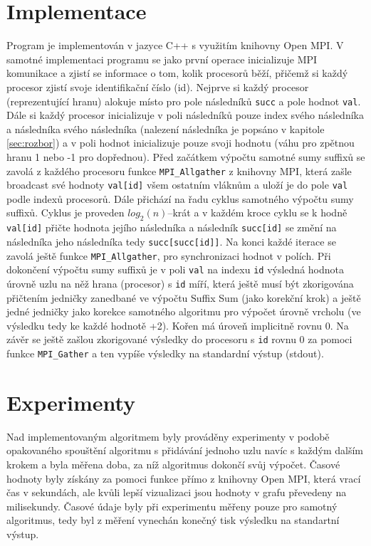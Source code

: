 \documentclass[12pt, a4paper]{article}
\begin{document}
\section{Implementace}
Program je implementován v jazyce C++ s využitím knihovny Open MPI. V samotné implementaci programu se jako první operace inicializuje MPI komunikace a zjistí se informace o tom, kolik procesorů běží, přičemž si každý procesor zjistí svoje identifikační číslo (id). Nejprve si každý procesor (reprezentující hranu) alokuje místo pro pole následníků \texttt{succ} a pole hodnot \texttt{val}. Dále si každý procesor inicializuje v poli následníků pouze index svého následníka a následníka svého následníka (nalezení následníka je popsáno v kapitole\,\ref{sec:rozbor}) a v poli hodnot inicializuje pouze svoji hodnotu (váhu pro zpětnou hranu 1 nebo -1 pro dopřednou). Před začátkem výpočtu samotné sumy suffixů se zavolá z každého procesoru funkce \texttt{MPI\_Allgather} z knihovny MPI, která zašle broadcast své hodnoty \texttt{val[id]} všem ostatním vláknům a uloží je do pole \texttt{val} podle indexů procesorů. Dále přichází na řadu cyklus samotného výpočtu sumy suffixů. Cyklus je proveden $log_{2}(n)$--krát a v každém kroce cyklu se k hodně \texttt{val[id]} přičte hodnota jejího následníka a následník \texttt{succ[id]} se změní na následníka jeho následníka tedy \texttt{succ[succ[id]]}. Na konci každé iterace se zavolá ještě funkce \texttt{MPI\_Allgather}, pro synchronizaci hodnot v polích.
Při dokončení výpočtu sumy suffixů je v poli \texttt{val} na indexu \texttt{id} výsledná hodnota úrovně uzlu na něž hrana (procesor) s \texttt{id} míří, která ještě musí být zkorigována přičtením jedničky zanedbané ve výpočtu Suffix Sum (jako korekční krok) a ještě jedné jedničky jako korekce samotného algoritmu pro výpočet úrovně vrcholu (ve výsledku tedy ke každé hodnotě +2). Kořen má úroveň implicitně rovnu 0. Na závěr se ještě zašlou zkorigované výsledky do procesoru s \texttt{id} rovnu 0 za pomoci funkce \texttt{MPI\_Gather} a ten vypíše výsledky na standardní výstup (stdout).


\section{Experimenty}
Nad implementovaným algoritmem byly prováděny experimenty v podobě opakovaného spouštění algoritmu s přidávání jednoho uzlu navíc s každým dalším krokem a byla měřena doba, za níž algoritmus dokončí svůj výpočet. Časové hodnoty byly získány za pomoci funkce přímo z knihovny Open MPI, která vrací čas v sekundách, ale kvůli lepší vizualizaci jsou hodnoty v grafu převedeny na milisekundy. Časové údaje byly při experimentu měřeny pouze pro samotný algoritmus, tedy byl z měření vynechán konečný tisk výsledku na standartní výstup.
\end{document}
